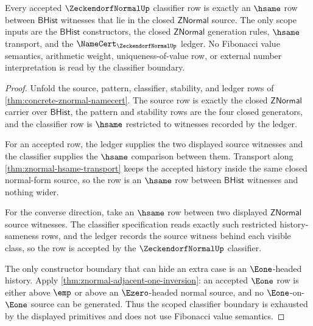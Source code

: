 \begin{theorem}
\label{thm:znormal-scoped-classifier-boundary}
Every accepted $\ZeckendorfNormalUp$ classifier row is exactly an $\hsame$ row between
$\mathsf{BHist}$ witnesses that lie in the closed $\mathsf{ZNormal}$ source.
The only scope inputs are the $\mathsf{BHist}$ constructors, the closed
$\mathsf{ZNormal}$ generation rules, $\hsame$ transport, and the
$\NameCert_{\ZeckendorfNormalUp}$ ledger. No Fibonacci value semantics, arithmetic
weight, uniqueness-of-value row, or external number interpretation is read by
the classifier boundary.
\end{theorem}
\begin{proof}
Unfold the source, pattern, classifier, stability, and ledger rows of
\autoref{thm:concrete-znormal-namecert}. The source row is exactly the closed
$\mathsf{ZNormal}$ carrier over $\mathsf{BHist}$, the pattern and stability rows
are the four closed generators, and the classifier row is $\hsame$ restricted
to witnesses recorded by the ledger.

For an accepted row, the ledger supplies the two displayed source witnesses and
the classifier supplies the $\hsame$ comparison between them. Transport along
\autoref{thm:znormal-hsame-transport} keeps the accepted history inside the
same closed normal-form source, so the row is an $\hsame$ row between
$\mathsf{BHist}$ witnesses and nothing wider.

For the converse direction, take an $\hsame$ row between two displayed
$\mathsf{ZNormal}$ source witnesses. The classifier specification reads exactly
such restricted history-sameness rows, and the ledger records the source
witness behind each visible class, so the row is accepted by the
$\ZeckendorfNormalUp$ classifier.

The only constructor boundary that can hide an extra case is an $\Eone$-headed
history. Apply \autoref{thm:znormal-adjacent-one-inversion}: an accepted
$\Eone$ row is either above $\emp$ or above an $\Ezero$-headed normal source,
and no $\Eone$-on-$\Eone$ source can be generated. Thus the scoped classifier
boundary is exhausted by the displayed primitives and does not use Fibonacci
value semantics.
\end{proof}

